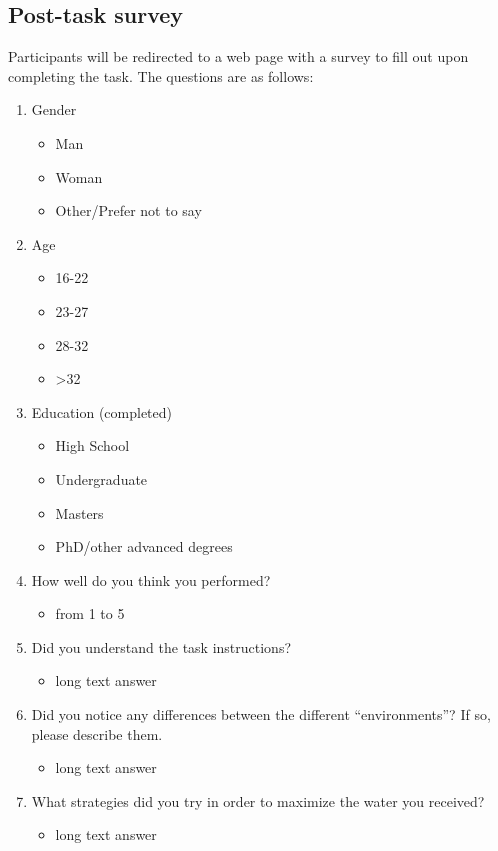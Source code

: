 \documentclass[11pt]{article}
\begin{document}
\subsection{Post-task survey}
\label{sec:org6ffb2cc}
Participants will be redirected to a web page with a survey to fill out upon completing the task. The questions are as follows:
\begin{enumerate}
\item Gender
\begin{itemize}
\item Man
\item Woman
\item Other/Prefer not to say
\end{itemize}
\item Age
\begin{itemize}
\item 16-22
\item 23-27
\item 28-32
\item >32
\end{itemize}
\item Education (completed)
\begin{itemize}
\item High School
\item Undergraduate
\item Masters
\item PhD/other advanced degrees
\end{itemize}
\item How well do you think you performed?
\begin{itemize}
\item from 1 to 5
\end{itemize}
\item Did you understand the task instructions?
\begin{itemize}
\item long text answer
\end{itemize}
\item Did you notice any differences between the different ``environments''? If so, please describe them.
\begin{itemize}
\item long text answer
\end{itemize}
\item What strategies did you try in order to maximize the water you received?
\begin{itemize}
\item long text answer
\end{itemize}

\end{enumerate}
\end{document}
